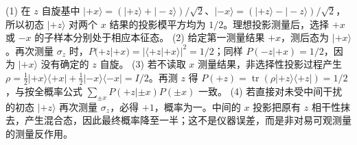 (1) 在 \(z\) 自旋基中 \(|+x\rangle=(|+z\rangle+|-z\rangle)/\sqrt2\)、\(|-x\rangle=(|+z\rangle-|-z\rangle)/\sqrt2\)，所以初态 \(|+z\rangle\) 对两个 \(x\) 结果的投影模平方均为 \(1/2\)。理想投影测量后，选择 \(+x\) 或 \(-x\) 的子样本分别处于相应本征态。
(2) 给定第一测量结果 \(+x\)，测后态为 \(|+x\rangle\)。再次测量 \(\sigma_z\) 时，\(P(+z|+x)=|\langle+z|+x\rangle|^2=1/2\)；同样 \(P(-z|+x)=1/2\)，因为 \(|+x\rangle\) 没有确定的 \(z\) 自旋。
(3) 若不读取 \(x\) 测量结果，非选择性投影过程产生 \(\rho=\frac12|+x\rangle\langle+x|+\frac12|-x\rangle\langle-x|=I/2\)。再测 \(z\) 得 \(P(+z)=\operatorname{tr}(\rho|+z\rangle\langle+z|)=1/2\)，与按全概率公式 \(\sum_{\pm x}P(+z|\pm x)P(\pm x)\) 一致。
(4) 若直接对未受中间干扰的初态 \(|+z\rangle\) 再次测量 \(\sigma_z\)，必得 \(+1\)，概率为一。中间的 \(x\) 投影把原有 \(z\) 相干性抹去，产生混合态，因此最终概率降至一半；这不是仪器误差，而是非对易可观测量的测量反作用。
